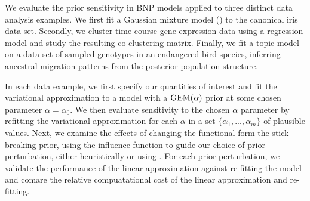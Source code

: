 We evaluate the prior sensitivity in BNP models applied to three distinct data
analysis examples. We first fit a Gaussian mixture model
() to the canonical iris data set. Secondly, we cluster
time-course gene expression data using a regression model and study the
resulting co-clustering matrix. Finally, we fit a topic model on a data set of
sampled genotypes in an endangered bird species, inferring  ancestral migration
patterns from the posterior population structure.

In each data example, we first specify our quantities of interest and fit the
variational approximation to a model with a $\mathrm{GEM}(\alpha)$ prior at some chosen
parameter $\alpha = \alpha_0$. We then evaluate sensitivity to the chosen
$\alpha$ parameter by refitting the variational approximation for each $\alpha$
in a set $\{\alpha_1, ..., \alpha_m\}$ of plausible values. Next, we examine the
effects of changing the functional form the stick-breaking prior, using the
influence function to guide our choice of prior perturbation, either
heuristically or using .  For each prior perturbation,
we validate the performance of the linear approximation against re-fitting the
model and comare the relative compuatational cost of the linear approximation
and re-fitting.
